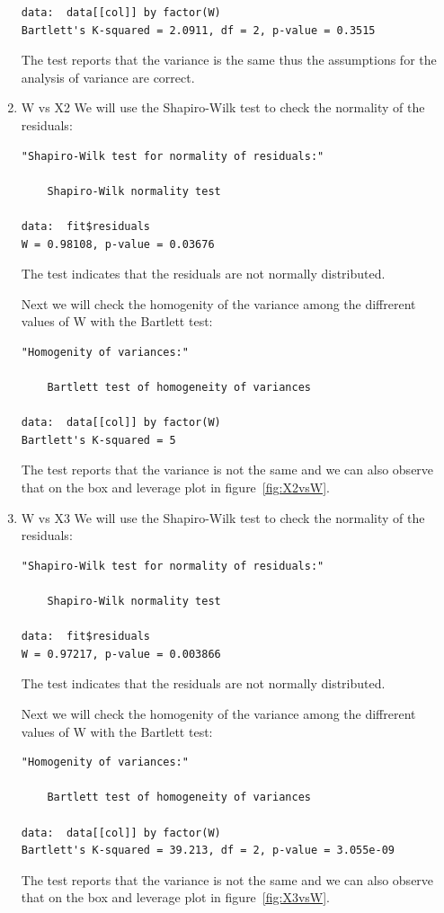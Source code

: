\documentclass{article}
\begin{document}
\begin{enumerate}
\begin{lstlisting}
data:  data[[col]] by factor(W)
Bartlett's K-squared = 2.0911, df = 2, p-value = 0.3515
  \end{lstlisting}
  The test reports that the variance is the same thus the assumptions for the
  analysis of variance are correct.
  
  \item W vs X2
  We will use the Shapiro-Wilk test to check the normality of the residuals:
  \begin{lstlisting}
"Shapiro-Wilk test for normality of residuals:"

	Shapiro-Wilk normality test

data:  fit$residuals
W = 0.98108, p-value = 0.03676
  \end{lstlisting}
  The test indicates that the residuals are not normally distributed.
  
  Next we will check the homogenity of the variance among the diffrerent values
  of W with the Bartlett test:
  \begin{lstlisting}
"Homogenity of variances:"

	Bartlett test of homogeneity of variances

data:  data[[col]] by factor(W)
Bartlett's K-squared = 5
  \end{lstlisting}
  The test reports that the variance is not the same and we can also observe
  that on the box and leverage plot in figure~\ref{fig:X2vsW}.
  
  \item W vs X3
  We will use the Shapiro-Wilk test to check the normality of the residuals:
  \begin{lstlisting}
"Shapiro-Wilk test for normality of residuals:"

	Shapiro-Wilk normality test

data:  fit$residuals
W = 0.97217, p-value = 0.003866
  \end{lstlisting}
  The test indicates that the residuals are not normally distributed.
  
  Next we will check the homogenity of the variance among the diffrerent values
  of W with the Bartlett test:  
  \begin{lstlisting}
"Homogenity of variances:"

	Bartlett test of homogeneity of variances

data:  data[[col]] by factor(W)
Bartlett's K-squared = 39.213, df = 2, p-value = 3.055e-09
  \end{lstlisting}
  The test reports that the variance is not the same and we can also observe
  that on the box and leverage plot in figure~\ref{fig:X3vsW}.
\end{enumerate}
\end{document}

